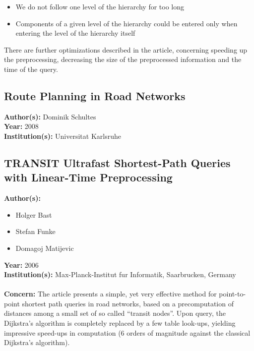 \documentclass[a4paper]{article}
\newenvironment{itemizesp}
{
    \begin{itemize}
}
{
    \end{itemize}
}
\newcommand{\textbff}[1]{{\large \textbf{#1}}}
\begin{document}
        \begin{itemize}
            \item We do not follow one level of the hierarchy for too long
            \item Components of a given level of the hierarchy could be entered only when entering the level of the hierarchy itself
        \end{itemize}
        {\hfill}

        There are further optimizations described in the article, concerning speeding up the preprocessing, decreasing the size of the preprocessed information and the time of the query. \\

        \subsection{Route Planning in Road Networks}
        \label{subsec:routeplandiz}

        \textbff{Author(s): } Dominik Schultes \\
        \textbff{Year: }2008\\
        \textbff{Institution(s): }Universitat Karlsruhe

        \subsection{TRANSIT Ultrafast Shortest-Path Queries with Linear-Time Preprocessing}
        \label{subsec:transit}

        \textbff{Author(s): }
        \begin{itemizesp}
            \item Holger Bast
            \item Stefan Funke
            \item Domagoj Matijevic
        \end{itemizesp}
        \textbff{Year: }2006 \\
        \textbff{Institution(s): } Max-Planck-Institut fur Informatik, Saarbrucken, Germany\\
        {\hfill}\\
        \textbff{Concern:} The article presents a simple, yet very effective method for point-to-point shortest path queries in road networks, based on a precomputation of distances among a small set of so called ``transit nodes''. Upon query, the Dijkstra's algorithm is completely replaced by a few table look-ups, yielding impressive speed-ups in computation (6 orders of magnitude against the classical Dijkstra's algorithm).\\
\end{document}

